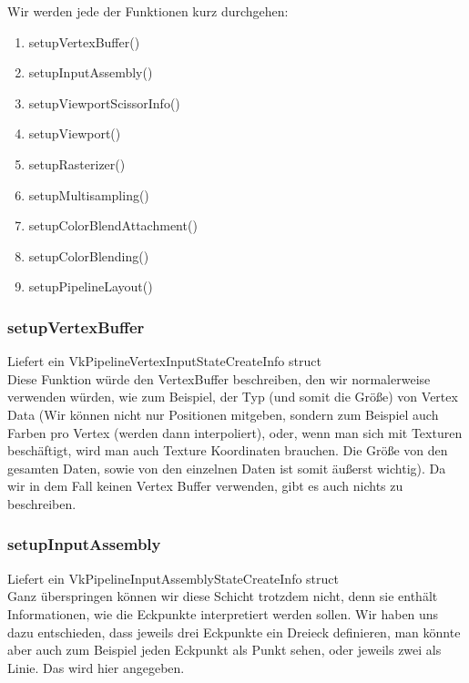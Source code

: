 \documentclass[11pt,a4paper]{report}
\begin{document}
Wir werden jede der Funktionen kurz durchgehen:
\begin{enumerate}
	\item setupVertexBuffer()
	\item setupInputAssembly()
	\item setupViewportScissorInfo()
	\item setupViewport()
	\item setupRasterizer()
	\item setupMultisampling()
	\item setupColorBlendAttachment()
	\item setupColorBlending()
	\item setupPipelineLayout()
\end{enumerate}

\subsubsection{setupVertexBuffer}
Liefert ein VkPipelineVertexInputStateCreateInfo struct\\
Diese Funktion würde den VertexBuffer beschreiben, den wir normalerweise verwenden würden, wie zum Beispiel, der Typ (und somit die Größe) von Vertex Data (Wir können nicht nur Positionen mitgeben, sondern zum Beispiel auch Farben pro Vertex (werden dann interpoliert), oder, wenn man sich mit Texturen beschäftigt, wird man auch Texture Koordinaten brauchen. Die Größe von den gesamten Daten, sowie von den einzelnen Daten ist somit äußerst wichtig). Da wir in dem Fall keinen Vertex Buffer verwenden, gibt es auch nichts zu beschreiben.

\subsubsection{setupInputAssembly}
Liefert ein VkPipelineInputAssemblyStateCreateInfo struct\\
Ganz überspringen können wir diese Schicht trotzdem nicht, denn sie enthält Informationen, wie die Eckpunkte interpretiert werden sollen. Wir haben uns dazu entschieden, dass jeweils drei Eckpunkte ein Dreieck definieren, man könnte aber auch zum Beispiel jeden Eckpunkt als Punkt sehen, oder jeweils zwei als Linie. Das wird hier angegeben.
\end{document}
